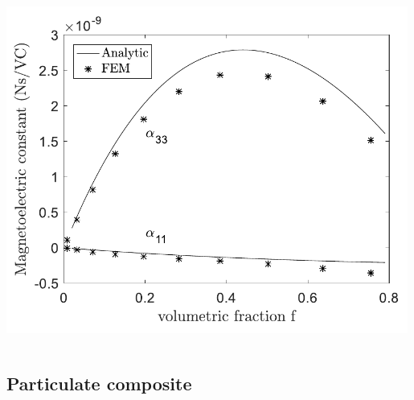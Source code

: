 \documentclass[compress]{beamer}
\begin{document}
\begin{frame}
\begin{columns}[totalwidth=\textwidth]
\end{columns}
\begin{columns}[totalwidth=\textwidth]
   \begin{column}{.40\textwidth}
   \centering
   \includegraphics[width=0.99\textwidth]{Graphic/04_cylinmatalpha.pdf}
   \end{column}
\end{columns}
\end{frame}


\subsection{Particulate composite}
\end{document}
